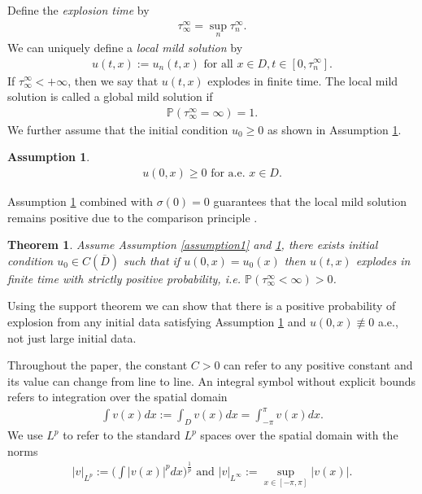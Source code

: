 \documentclass[12pt]{article}
\newtheorem{theorem}{Theorem}
\newtheorem{assumption}{Assumption}
\numberwithin{equation}{section}
\begin{document}
Define the \textit{explosion time} by
\begin{align}
    \tau_\infty^\infty=\sup_n\tau_n^\infty.\label{def:tau_infty}
\end{align}
We can uniquely define a \textit{local mild solution }by
\begin{align}
    u(t,x):=u_n(t,x)\text{ for all }x\in D,t\in[0,\tau_n^\infty].\label{def:local mild solution}
\end{align}
If $\tau_\infty^\infty<+\infty$, then we say that $u(t,x)$ explodes in finite time. The local mild solution is called a global mild solution if
\begin{align}
    \mathbb{P}(\tau_\infty^\infty=\infty)=1.
\end{align}
We further assume that the initial condition $u_0\geq 0$ as shown in Assumption \ref{assumption2}.
\begin{assumption}\label{assumption2}
    \begin{align}
        u(0,x)\geq 0 \text{ for a.e. } x\in D. \label{assum: positivity}
    \end{align}
\end{assumption}
Assumption \ref{assumption2} combined with $\sigma(0)=0$ guarantees that the local mild solution remains positive due to the comparison principle \cite{Kotelenez1992,Mueller199101}.
\begin{theorem}\label{thm:main result}
    Assume Assumption \ref{assumption1} and \ref{assumption2}, there exists initial condition $u_0\in C(\overline{D})$ such that if $u(0,x)=u_0(x)$ then $u(t,x)$ explodes in finite time with strictly positive probability, i.e. $\mathbb{P}(\tau_\infty^\infty<\infty)>0$.
\end{theorem}
Using the support theorem \cite[Theorem 2.1]{Bally1995} we can show that there is a positive probability of explosion from any initial data satisfying Assumption \ref{assumption2} and $u(0,x)\not\equiv 0$ a.e., not just large initial data.

Throughout the paper, the constant $C>0$ can refer to any positive constant and its value can change from line to line. An integral symbol without explicit bounds refers to integration over the spatial domain
\begin{align*}
    \int v(x)dx:=\int_Dv(x)dx=\int_{-\pi}^\pi v(x)dx.
\end{align*}
We use $L^p$ to refer to the standard $L^p$ spaces over the spatial domain with the norms
\begin{align}
    |v|_{L^p}:=\Big(\int|v(x)|^pdx\Big)^{\frac{1}{p}}\text{ and }|v|_{L^\infty}:=\sup_{x\in[-\pi,\pi]}|v(x)|.\label{def:L^p norm}
\end{align}
\end{document}
